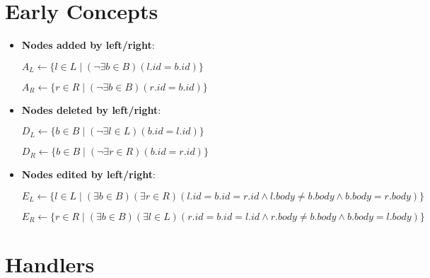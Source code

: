\documentclass[a4paper]{article}
\begin{document}
    \section{Early Concepts}

    \begin{itemize}
        \item \textbf{Nodes added by left/right}:
        
        $A_L \leftarrow \{l \in L \mid (\lnot \exists b \in B)(l.id = b.id)\}$

        $A_R \leftarrow \{r \in R \mid (\lnot \exists b \in B)(r.id = b.id)\}$

        \item \textbf{Nodes deleted by left/right}:
        
        $D_L \leftarrow \{b \in B \mid (\lnot \exists l \in L)(b.id = l.id)\}$

        $D_R \leftarrow \{b \in B \mid (\lnot \exists r \in R)(b.id = r.id)\}$

        \item \textbf{Nodes edited by left/right}:
        
        $E_L \leftarrow \{l \in L \mid (\exists b \in B)(\exists r \in R)(l.id = b.id = r.id \land l.body \neq b.body \land b.body = r.body)\}$

        $E_R \leftarrow \{r \in R \mid (\exists b \in B)(\exists l \in L)(r.id = b.id = l.id \land r.body \neq b.body \land b.body = l.body)\}$
    \end{itemize}

    

    \section{Handlers}

    
    
    
    
    
    
\end{document}
